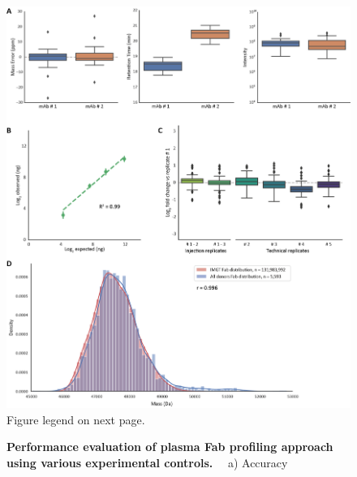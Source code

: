 \begin{subappendices}
  \begin{figure}[!h]
    \center
    \includegraphics[]{Chapter.3/Figures/fs1.png}
    \captionsetup{singlelinecheck = false, format= hang}
    \caption{
      Figure legend on next page.
    }
    \label{fig:figs3.1}
  \end{figure}
  \addtocounter{figure}{-1}
  \begin{figure}[t!]
    \caption{
      \textbf{Performance evaluation of plasma Fab profiling approach using various experimental controls.} ~~a) Accuracy
}
\end{figure}
\end{subappendices}
